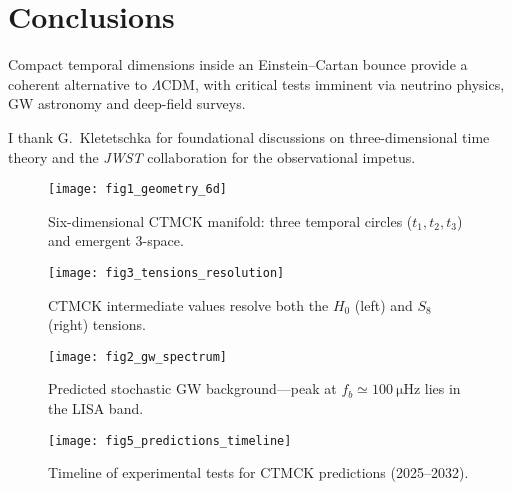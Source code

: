 \documentclass[reprint,aps,prd,amsmath,amssymb,
               nofootinbib,longbibliography]{revtex4-2}
\begin{document}
\section{Conclusions}\label{sec:conclusions}
Compact temporal dimensions inside an Einstein–Cartan bounce
provide a coherent alternative to $\Lambda$CDM, with critical tests
imminent via neutrino physics, GW astronomy and deep-field surveys.

\begin{acknowledgments}
I thank G.~Kletetschka for foundational discussions on three-dimensional
time theory and the \textit{JWST} collaboration for the observational impetus.
\end{acknowledgments}

\begin{figure}[t]
  \centering\texttt{[image: fig1\_geometry\_6d]}
  \caption{Six-dimensional CTMCK manifold: three temporal circles
           ($t_1,t_2,t_3$) and emergent 3-space.}
  \label{fig:geometry}
\end{figure}

\begin{figure}[t]
  \centering\texttt{[image: fig3\_tensions\_resolution]}
  \caption{CTMCK intermediate values resolve both
           the $H_0$ (left) and $S_8$ (right) tensions.}
  \label{fig:tensions}
\end{figure}

\begin{figure}[t]
  \centering\texttt{[image: fig2\_gw\_spectrum]}
  \caption{Predicted stochastic GW background—peak at
           $f_b\simeq\SI{100}{\micro\hertz}$ lies in the \textsc{LISA} band.}
  \label{fig:gw}
\end{figure}

\begin{figure}[t]
  \centering\texttt{[image: fig5\_predictions\_timeline]}
  \caption{Timeline of experimental tests for CTMCK predictions
           (2025–2032).}
  \label{fig:timeline}
\end{figure}



\end{document}
